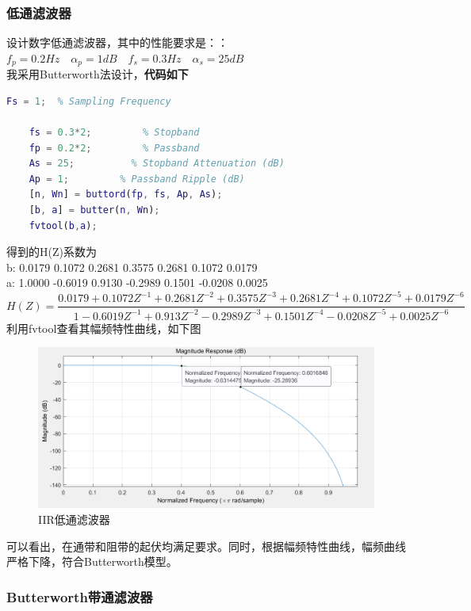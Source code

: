 \documentclass[UTF8]{ctexart}
\begin{document}
\subsubsection{低通滤波器}
设计数字低通滤波器，其中的性能要求是：：$f_p=0.2Hz \quad {\alpha}_p=1dB \quad f_s=0.3Hz \quad {\alpha}_s=25dB$\\
我采用Butterworth法设计，\textbf{代码如下}
\begin{lstlisting}[language=matlab]
	Fs = 1;  % Sampling Frequency
	
	fs = 0.3*2;         % Stopband 
	fp = 0.2*2;         % Passband 
	As = 25;          % Stopband Attenuation (dB)
	Ap = 1;         % Passband Ripple (dB)
	[n, Wn] = buttord(fp, fs, Ap, As);
	[b, a] = butter(n, Wn);
	fvtool(b,a);
\end{lstlisting}
得到的H(Z)系数为\\
\hspace*{2em}b:  0.0179    0.1072    0.2681    0.3575    0.2681    0.1072    0.0179 \\
\hspace*{2em}a:  1.0000   -0.6019    0.9130   -0.2989    0.1501   -0.0208    0.0025 \\
\[
H(Z)=\frac{0.0179+0.1072Z^{-1}+0.2681Z^{-2}+0.3575Z^{-3}+0.2681Z^{-4}+0.1072Z^{-5}+0.0179Z^{-6}}{1-0.6019Z^{-1}+0.913Z^{-2}-0.2989Z^{-3}+0.1501Z^{-4}-0.0208Z^{-5}+0.0025Z^{-6}}
\]
利用fvtool查看其幅频特性曲线，如下图
\begin{figure}[H]
	\centering
	\includegraphics[scale=0.8]{figs/iir2}
	\caption{IIR低通滤波器}
\end{figure}
可以看出，在通带和阻带的起伏均满足要求。同时，根据幅频特性曲线，幅频曲线严格下降，符合Butterworth模型。
\subsubsection{Butterworth带通滤波器}

 
	
\end{document}
